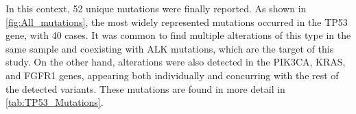 In this context, 52 unique mutations were finally reported. As shown in \autoref{fig:All_mutations}, the most widely represented mutations occurred in the TP53 gene, with 40 cases. It was common to find multiple alterations of this type in the same sample and coexisting with ALK mutations, which are the target of this study. On the other hand, alterations were also detected in the PIK3CA, KRAS, and FGFR1 genes, appearing both individually and concurring with the rest of the detected variants. These mutations are found in more detail in \autoref{tab:TP53_Mutations}.

\begin{table}[t]
\centering
{}
\end{table}
